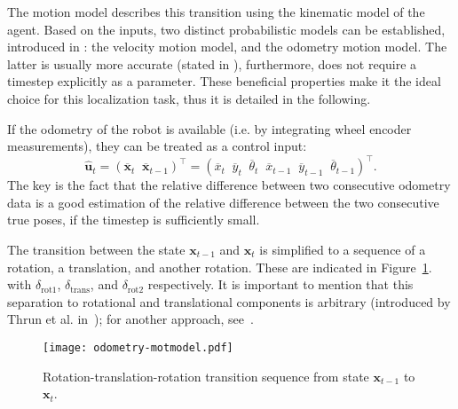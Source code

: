 The motion model describes this transition using the kinematic model of the agent.
Based on the inputs, two distinct probabilistic models can be established, introduced in \cite{Thrun2005}: the velocity motion model,
and the odometry motion model.
The latter is usually more accurate (stated in \cite{Thrun2005}),
furthermore, does not require a timestep explicitly as a parameter.
These beneficial properties make it the ideal choice for this localization task,
thus it is detailed in the following.

If the odometry of the robot is available (i.e. by integrating wheel encoder measurements),
they can be treated as a control input:
\begin{equation}\label{eq:odom-raw-input}
    \hat{\mathbf{u}}_t = (\overline{\mathbf{x}}_t\;\;\overline{\mathbf{x}}_{t-1})^\top =
    \left(\overline{x}_t\;\;\overline{y}_t\;\;\overline{\theta}_t\;\;\overline{x}_{t-1}\;\;\overline{y}_{t-1}\;\;\overline{\theta}_{t-1}\right)^\top.
\end{equation}
The key is the fact that the relative difference between
two consecutive odometry data is a good estimation of the relative difference between
the two consecutive true poses, if the timestep is sufficiently small.

The transition between the state $\mathbf{x}_{t-1}$ and $\mathbf{x}_{t}$ is simplified to a sequence of a rotation, a translation,
and another rotation.
These are indicated in Figure~\ref{fig:odom-mot-model}. with $\delta_{\mathrm{rot1}}$, $\delta_{\mathrm{trans}}$,
and $\delta_{\mathrm{rot2}}$ respectively.
It is important to mention that this separation to rotational and translational components is arbitrary
(introduced by Thrun et al. in~\cite{Thrun2005}); for another approach, see~\cite{Eliazar2004}.
\begin{figure}[htbp]
    \centering
    \texttt{[image: odometry-motmodel.pdf]}
    \caption{Rotation-translation-rotation transition sequence from state $\mathbf{x}_{t-1}$ to $\mathbf{x}_{t}$.}
    \label{fig:odom-mot-model}
\end{figure}

